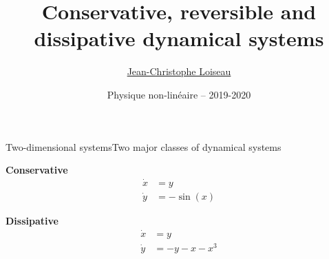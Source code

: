 \documentclass[usenames,dvipsnames,svgnames,10pt,aspectratio=169]{beamer}
\title[Nonlinear physics] %
{
	Conservative, reversible and \\
  dissipative dynamical systems
}
\author[J.-Ch.~Loiseau] %
{
	\underline{Jean-Christophe Loiseau}
}
\institute[unused]
{
	\url{jean-christophe.loiseau@ensam.eu} \\
	Laboratoire DynFluid \\
	Arts et M\'etiers, France.
}
\date[unused]{Physique non-lin\'eaire -- 2019-2020}
\begin{document}
\titleframe	%


\begin{frame}[t, c]{Two-dimensional systems}{Two major classes of dynamical systems}
  \begin{minipage}{.48\textwidth}
    \centering

    \textbf{Conservative}
    \[
    \begin{aligned}
      \dot{x} & = y \\
      \dot{y} & = -\sin(x) \end{aligned}
    \]
  \end{minipage}%
  \hfill
  \begin{minipage}{.48\textwidth}
    \centering
    \textbf{Dissipative}
    \[
    \begin{aligned} \dot{x} & = y \\
      \dot{y} & = -y - x - x^3
    \end{aligned}
    \]
  \end{minipage}

  \vspace{1cm}
\end{frame}
\end{document}
